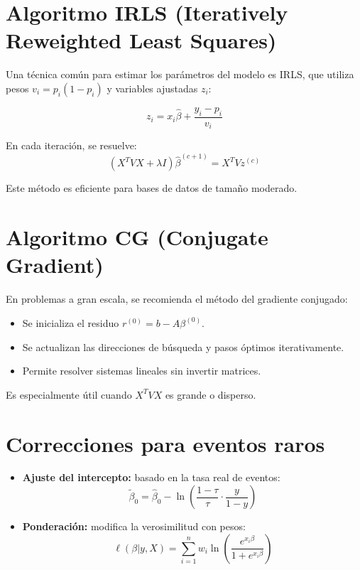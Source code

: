 \documentclass[12pt]{article}
\begin{document}
\section*{Algoritmo IRLS (Iteratively Reweighted Least Squares)}
Una técnica común para estimar los parámetros del modelo es IRLS, que utiliza pesos $v_i = p_i(1 - p_i)$ y variables ajustadas $z_i$:

\begin{equation}
    z_i = x_i \hat{\beta} + \frac{y_i - p_i}{v_i}
\end{equation}

En cada iteración, se resuelve:
\begin{equation}
    (X^T V X + \lambda I) \hat{\beta}^{(c+1)} = X^T V z^{(c)}
\end{equation}

Este método es eficiente para bases de datos de tamaño moderado.

\section*{Algoritmo CG (Conjugate Gradient)}
En problemas a gran escala, se recomienda el método del gradiente conjugado:

\begin{itemize}
    \item Se inicializa el residuo $r^{(0)} = b - A\beta^{(0)}$.
    \item Se actualizan las direcciones de búsqueda y pasos óptimos iterativamente.
    \item Permite resolver sistemas lineales sin invertir matrices.
\end{itemize}

Es especialmente útil cuando $X^T V X$ es grande o disperso.

\section*{Correcciones para eventos raros}
\begin{itemize}
    \item \textbf{Ajuste del intercepto:} basado en la tasa real de eventos:
    \begin{equation}
        \tilde{\beta}_0 = \hat{\beta}_0 - \ln \left( \frac{1 - \tau}{\tau} \cdot \frac{y}{1 - y} \right)
    \end{equation}
    \item \textbf{Ponderación:} modifica la verosimilitud con pesos:
    \begin{equation}
        \ell(\beta|y,X) = \sum_{i=1}^n w_i \ln \left( \frac{e^{x_i \beta}}{1 + e^{x_i \beta}} \right)
    \end{equation}
\end{itemize}
\end{document}
